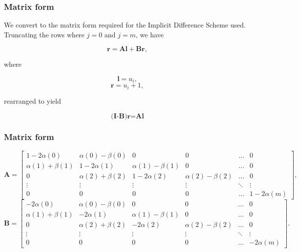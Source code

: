\documentclass{beamer}
\begin{document}
  \begin{frame}
    \frametitle{Matrix form}
    We convert to the matrix form required for the Implicit Difference Scheme used. Truncating the rows where \(j=0\) and \(j=m\), we have

    \begin{equation}
      \textbf{r} = \textbf{Al} + \textbf{Br},
    \end{equation}

    where

    \begin{equation}
      \textbf{l} = u_{i},
    \end{equation}
    \begin{equation}
      \textbf{r} = u_i+1,
    \end{equation}
    
    rearranged to yield
    
    \begin{equation}
      \textbf{(I-B)}\textbf{r} = \textbf{Al}
    \end{equation}

  \end{frame}

  \begin{frame}
    \frametitle{Matrix form}
    \tiny
    \begin{equation}
      \textbf{A} = \begin{bmatrix}
        1-2\alpha(0) & \alpha(0) - \beta(0) & 0 & 0 & \hdots & 0 \\
        \alpha(1) + \beta(1) & 1-2\alpha(1) & \alpha(1) - \beta(1) & 0 & \hdots & 0 \\
        0 & \alpha(2) + \beta(2) & 1-2\alpha(2) & \alpha(2) - \beta(2) & \hdots & 0 \\
        \vdots & \vdots & \vdots & \vdots & \ddots & \vdots \\
        0 & 0 & 0 & 0 & \hdots & 1-2\alpha(m)
      \end{bmatrix},
    \end{equation}
    \begin{equation}
      \textbf{B} = \begin{bmatrix}
        -2\alpha(0) & \alpha(0) - \beta(0) & 0 & 0 & \hdots & 0 \\
        \alpha(1) + \beta(1) & -2\alpha(1) & \alpha(1) - \beta(1) & 0 & \hdots & 0 \\
        0 & \alpha(2) + \beta(2) & -2\alpha(2) & \alpha(2) - \beta(2) & \hdots & 0 \\
        \vdots & \vdots & \vdots & \vdots & \ddots & \vdots \\
        0 & 0 & 0 & 0 & \hdots & -2\alpha(m)
      \end{bmatrix}.
    \end{equation}
  \end{frame}
\end{document}
